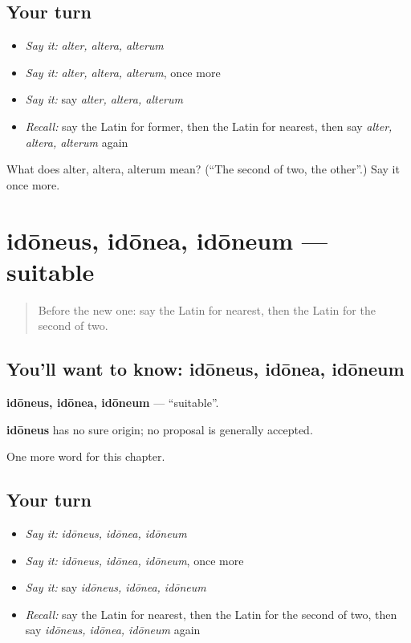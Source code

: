 \subsection*{Your turn}
\begin{itemize}
\raggedright
  \item \emph{Say it:} \emph{alter, altera, alterum}
  \item \emph{Say it:} \emph{alter, altera, alterum}, once more
  \item \emph{Say it:} say \emph{alter, altera, alterum}
  \item \emph{Recall:} say the Latin for former, then the Latin for nearest, then say \emph{alter, altera, alterum} again
\end{itemize}

\begin{tcolorbox}[breakable,colback=teal!4,colframe=teal!35!black,title={Before you move on}]
What does alter, altera, alterum mean? (\textquotedblleft{}The second of two, the other\textquotedblright{}.) Say it once more.
\end{tcolorbox}
\section[idōneus, idōnea, idōneum]{idōneus, idōnea, idōneum — suitable}

\label{lesson:LA-C268-idoneus}



\begin{quote}
Before the new one: say the Latin for nearest, then the Latin for the second of two.
\end{quote}

\subsection*{You'll want to know: idōneus, idōnea, idōneum}
\textbf{idōneus, idōnea, idōneum} — \textquotedblleft{}suitable\textquotedblright{}.

\begin{cousinweb}
\textbf{idōneus} has no sure origin; no proposal is generally accepted.
\end{cousinweb}

\begin{grammarlens}[title={What you've built}]
One more word for this chapter.
\end{grammarlens}

\subsection*{Your turn}
\begin{itemize}
\raggedright
  \item \emph{Say it:} \emph{idōneus, idōnea, idōneum}
  \item \emph{Say it:} \emph{idōneus, idōnea, idōneum}, once more
  \item \emph{Say it:} say \emph{idōneus, idōnea, idōneum}
  \item \emph{Recall:} say the Latin for nearest, then the Latin for the second of two, then say \emph{idōneus, idōnea, idōneum} again
\end{itemize}

